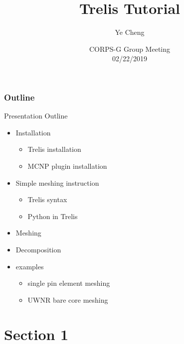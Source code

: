 \documentclass[fleqn]{beamer}
\title[Short Title]{
    Trelis Tutorial}
\author[Your Name]{
    Ye Cheng}
\institute[Kansas State University]{
    Mechanical and Nuclear Engineering \\
    Kansas State University}
\date[Short Version]{
    CORPS-G Group Meeting \\
    02/22/2019}
\begin{document}
    \newcommand{\beginbackup}{
        \newcounter{framenumbervorappendix}
        \setcounter{framenumbervorappendix}{\value{framenumber}}
    }
    \newcommand{\backupend}{
        \addtocounter{framenumbervorappendix}{-\value{framenumber}}
        \addtocounter{framenumber}{\value{framenumbervorappendix}} 
    }
    
    \begin{frame}
        \titlepage
    \end{frame}
    \begin{frame}
        \frametitle{Outline}
        \begin{block}{Presentation Outline}
            \begin{itemize}
                \item Installation
                \begin{itemize}
                    \item Trelis installation
                    \item MCNP plugin installation
                \end{itemize}
                \item Simple meshing instruction
                \begin{itemize}
                 \item Trelis syntax
                 \item Python in Trelis
                \end{itemize}
                \item Meshing
                \item Decomposition
                \item examples
		  \begin{itemize}
		   \item single pin element meshing
		   \item UWNR bare core meshing
		  \end{itemize}

            \end{itemize}
        \end{block}
    \end{frame}
    \section{Section 1}
    
\end{document}
